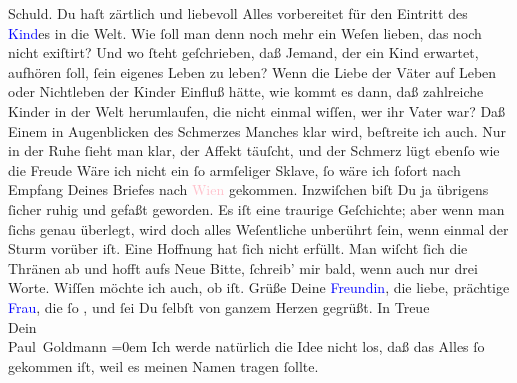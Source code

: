                Schuld. Du haſt zärtlich und liebevoll Alles vorbereitet für den Eintritt des \textcolor{blue}{Kind}{}es in die Welt. Wie ſoll
               man denn noch mehr ein Weſen lieben, das noch nicht exiſtirt? Und wo ſteht
               geſchrieben, daß Jemand, der ein Kind erwartet, aufhören {\pb}ſoll, ſein eigenes Leben zu leben? Wenn die Liebe
               der Väter auf Leben oder Nichtleben der Kinder Einfluß hätte, wie kommt es dann, daß
               zahlreiche Kinder in der Welt herumlaufen, die nicht einmal wiſſen, wer ihr Vater
                  war?{\dotsfive}\pend
           \pstart
           Daß Einem in Augenblicken des Schmerzes Manches klar wird, beſtreite ich auch. Nur in
               der Ruhe ſieht man klar, der Affekt täuſcht, und der Schmerz lügt ebenſo wie die
                  Freude{\dotsfour}\pend
           \pstart
           Wäre ich nicht ein ſo armſeliger Sklave, ſo wäre ich ſofort nach Empfang Deines
               Briefes {\pb}nach \textcolor{pink}{Wien}{}\ledrightnote{\textcolor{pink}{Wien}} gekommen. Inzwiſchen biſt Du ja übrigens ſicher ruhig und gefaßt
               geworden. Es iſt eine traurige Geſchichte; aber wenn man ſichs genau überlegt, wird
               doch alles Weſentliche unberührt ſein, wenn einmal der Sturm vorüber iſt. Eine
               Hoffnung hat ſich nicht erfüllt. Man wiſcht ſich die Thränen ab und hofft aufs Neue{\dotsfour}\pend
           \pstart
           Bitte, ſchreib’ mir bald, wenn auch nur drei Worte. Wiſſen möchte ich auch, ob
                  \label{K_L02827-2v}\label{K_L02827-2h} iſt.\pend
           \pstart
           Grüße Deine \textcolor{blue}{Freundin}{}, {\pb}die liebe, prächtige \textcolor{blue}{Frau}{}, die ſo \label{K_L02827-3v}\label{K_L02827-3h}, und ſei Du ſelbſt von ganzem Herzen gegrüßt.\pend
           \pstart
           In Treue {\\[\baselineskip]}Dein {\\[\baselineskip]}\spacefill\mbox{Paul Goldmann}\pend
           \leftskip=0em{}\pstart
           \noindent{}Ich werde natürlich die Idee nicht los, daß das Alles ſo gekommen iſt, weil es
                  meinen Namen tragen ſollte.\pend
           \endnumbering{}  
      